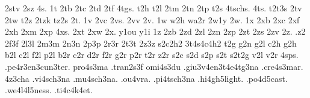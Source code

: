 {    2stv
    2sz
    4s.
    1t
    2tb
    2tc
    2td
    2tf
    4tgs.
    t2h
    t2l
    2tm
    2tn
    2tp
    t2s
    4tschs.
    4ts.
    t2t3s
    2tv
    2tw
    t2z
    2tzk
    tz2s
    2t.
    1v
    2vc
    2vs.
    2vv
    2v.
    1w
    w2h
    wa2r
    2w1y
    2w.
    1x
    2xb
    2xc
    2xf
    2xh
    2xm
    2xp
    4xs.
    2xt
    2xw
    2x.
    y1ou
    y1i
    1z
    2zb
    2zd
    2zl
    2zn
    2zp
    2zt
    2zs
    2zv
    2z.
    .z2
    2f3f
    2l3l
    2m3m
    2n3n
    2p3p
    2r3r
    2t3t
    2z3z
    s2c2h2
    3t4s4c4h2
    t2g
    g2n
    g2l
    c2h
    g2h
    b2l
    c2l
    f2l
    p2l
    b2r
    c2r
    d2r
    f2r
    g2r
    p2r
    t2r
    z2r
    s2c
    s2d
    s2p
    s2t
    s2t2g
    v2l
    v2r
    4sps.
    .pe4r3en3cun3ter.
    pro4s3ma
    .tran2s3f
    omi4s3du
    .giu3v4en3t4e4tg3na
    .cre4s3mar.
    4z3cha
    .vi4sch3na
    .mu4sch3na.
    .ou4vra.
    .pi4tsch3na
    .hi4gh5light.
    .po4d5cast.
    .we4l4l5ness.
    .ti4c4k4et.    
}                          %

